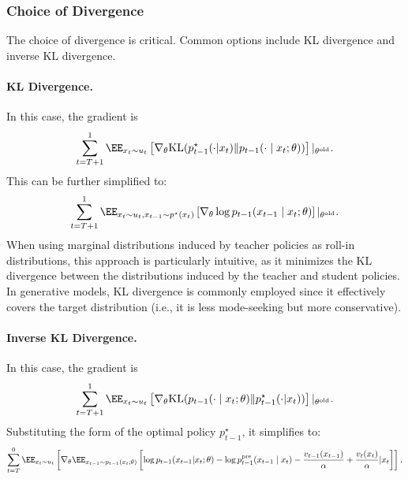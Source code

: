 \subsubsection{Choice of Divergence}

The choice of divergence is critical. Common options include KL divergence and inverse KL divergence.

\paragraph{KL Divergence.} In this case, the gradient is 
\begin{align}\label{eq:KL_appraoch}
 \sum_{t=T+1}^1 \EE_{x_t\sim u_t} \left[ \nabla_{\theta} \KL(p^{\star}_{t-1}(\cdot|x_t) \| p_{t-1}(\cdot \mid x_t;\theta))   \right]|_{\theta^{\mathrm{old}}}. 
\end{align}
This can be further simplified to:
\begin{align*}
 \sum_{t=T+1}^1 \EE_{x_t\sim u_t, x_{t-1}\sim p^{\star}(x_t) } \left[\nabla_{\theta}  \log p_{t-1}(x_{t-1} \mid x_t;\theta)  \right]|_{\theta^{\mathrm{old}}}. 
\end{align*} 
When using marginal distributions induced by teacher policies as roll-in distributions, this approach is particularly intuitive, as it minimizes the KL divergence between the distributions induced by the teacher and student policies. In generative models, KL divergence is commonly employed since it effectively covers the target distribution (i.e., it is less mode-seeking but more conservative).

\paragraph{Inverse KL Divergence.}

In this case, the gradient is 
\begin{align}
    \sum_{t=T+1}^1 \EE_{x_t\sim u_t} \left[\nabla_{\theta} \KL(p_{t-1}(\cdot \mid x_t;\theta) \| p^{\star}_{t-1}(\cdot|x_t))   \right]|_{\theta^{\mathrm{old}}}.  \label{eq:inverse_KL}
\end{align}
Substituting the form of the optimal policy $p^{\star}_{t-1}$, it simplifies to:
\begin{align}
  \sum_{t=T}^0  \EE_{x_t \sim u_t} \left[ \nabla_{\theta}\EE_{x_{t-1}\sim p_{t-1}(x_t;\theta) } \left [ \log p_{t-1}(x_{t-1}|x_t;\theta) -\log p^{\pre}_{t-1}(x_{t-1}\mid x_t) -\frac{v_{t-1}(x_{t-1})}{\alpha} + \frac{v_{t}(x_{t})}{\alpha}    |x_t \right] \right]. \label{eq:all_form}
\end{align}

